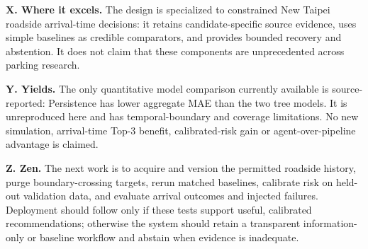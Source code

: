 \documentclass[conference,letterpaper,10pt]{IEEEtran}
\begin{document}
\noindent\textbf{X. Where it excels.} The design is specialized to constrained New Taipei roadside arrival-time decisions: it retains candidate-specific source evidence, uses simple baselines as credible comparators, and provides bounded recovery and abstention. It does not claim that these components are unprecedented across parking research.

\noindent\textbf{Y. Yields.} The only quantitative model comparison currently available is source-reported: Persistence has lower aggregate MAE than the two tree models. It is unreproduced here and has temporal-boundary and coverage limitations. No new simulation, arrival-time Top-3 benefit, calibrated-risk gain or agent-over-pipeline advantage is claimed.

\noindent\textbf{Z. Zen.} The next work is to acquire and version the permitted roadside history, purge boundary-crossing targets, rerun matched baselines, calibrate risk on held-out validation data, and evaluate arrival outcomes and injected failures. Deployment should follow only if these tests support useful, calibrated recommendations; otherwise the system should retain a transparent information-only or baseline workflow and abstain when evidence is inadequate.



\end{document}
